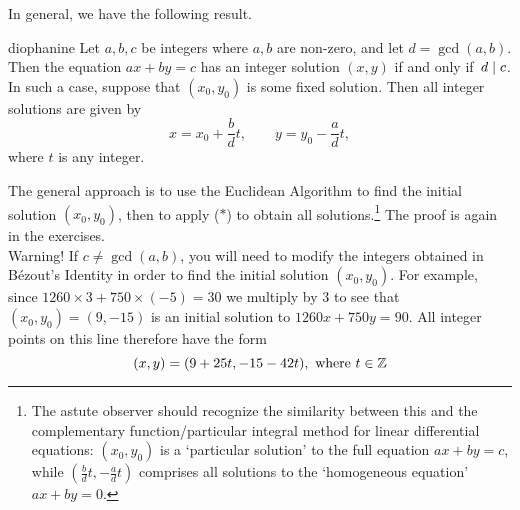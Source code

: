 In general, we have the following result.

\begin{thm}{}{diophanine}
Let $a,b,c$ be integers where $a,b$ are non-zero, and let $d=\gcd(a,b)$. Then the equation $ax+by=c$ has an integer solution $(x,y)$ if and only if $\,d\mid c$.\\
In such a case, suppose that $(x_0,y_0)$ is some fixed solution. Then all integer solutions are given by
\[x=x_0+\frac bdt,\qquad y=y_0-\frac adt,\tag*{($\ast$)}\]
where $t$ is any integer.
\end{thm}

 The general approach is to use the Euclidean Algorithm to find the initial solution $(x_0,y_0)$, then to apply ($\ast$) to obtain all solutions.\footnote{The astute observer should recognize the similarity between this and the complementary function/particular integral method for linear differential equations: $(x_0,y_0)$ is a `particular solution' to the full equation $ax+by=c$, while $(\frac bdt,-\frac adt)$ comprises all solutions to the `homogeneous equation' $ax+by=0$.} The proof is again in the exercises.\\

 Warning! If $c\neq\gcd(a,b)$, you will need to modify the integers obtained in Bézout's Identity in order to find the initial solution $(x_0,y_0)$. For example, since $1260\times 3+750\times(-5)=30$ we multiply by 3 to see that $(x_0,y_0)=(9,-15)$ is an initial solution to $1260x+750y=90$. All integer points on this line therefore have the form
\[(x,y)=(9+25t,-15-42t), \text{ where }t\in\mathbb{Z}\]

